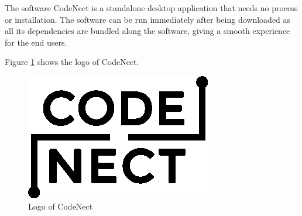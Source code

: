 
The software CodeNect is a standalone desktop application that needs no process
or installation. The software can be run immediately after being downloaded as
all its dependencies are bundled along the software, giving a smooth experience
for the end users.

\parx
Figure \ref{fig:cn_logo} shows the logo of CodeNect.

\begin{figure}[H]
	\centering
	\captionsetup{justification=centering}
	\captionsetup[figure]{list=yes}
	\includegraphics[width=\linewidth]{media/cn_logo.png}
	\caption[CodeNect Logo]{Logo of CodeNect}
	\label{fig:cn_logo}
\end{figure}
